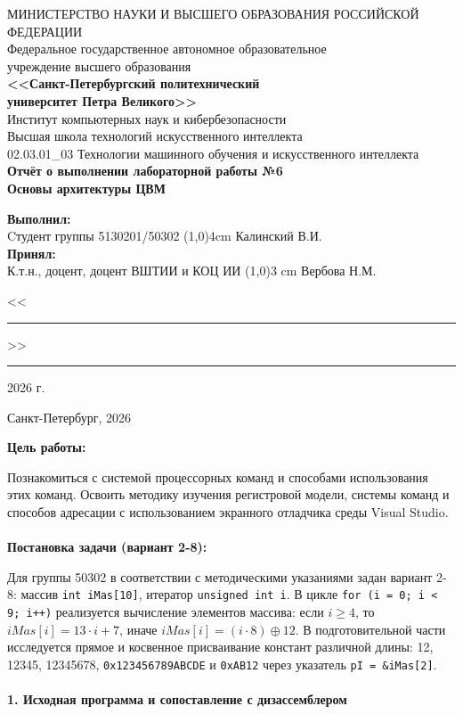 \documentclass[14pt, a4paper]{extarticle}
\begin{document}
	\thispagestyle{empty}
	\begin{center}
		\hspace{0.2cm}МИНИСТЕРСТВО НАУКИ И ВЫСШЕГО ОБРАЗОВАНИЯ РОССИЙСКОЙ ФЕДЕРАЦИИ\\
		Федеральное государственное автономное образовательное\\
		учреждение высшего образования\\
		{\bf <<Санкт-Петербургский политехнический\\
			университет Петра Великого>>}\\
		Институт компьютерных наук и кибербезопасности\\
		Высшая школа технологий искусственного интеллекта\\
		02.03.01\_03 Технологии машинного обучения и искусственного интеллекта\\
		\vspace{3cm}
		\Large\bf{
			Отчёт о выполнении лабораторной работы №6\\
			Основы архитектуры ЦВМ\\[1cm]
		}
	\end{center}
	\vspace{2cm}
	\begin{flushleft}
		{\bf Выполнил:}\\
		Cтудент группы 5130201/50302 \hfill
		\line(1,0){4cm} \quad Калинский В.И.\\
		{\bf Принял:}\\
		К.т.н., доцент, доцент ВШТИИ и КОЦ ИИ \hfill
		\line(1,0){3 cm} \quad Вербова Н.М.\\[0.5cm]
		{ \hfill<<\rule{1cm}{0.5pt}>>\rule{2cm}{0.5pt}\hspace{3pt}2026 г.}
	\end{flushleft}
	\vspace{1cm}
	\begin{center}
		Санкт-Петербург, 2026
	\end{center}
	\newpage

	\noindent \textbf{Цель работы:}
	
	Познакомиться с системой процессорных команд и способами использования этих команд. Освоить методику изучения регистровой модели, системы команд и способов адресации с использованием экранного отладчика среды Visual Studio.
	\\\\
	\noindent \textbf{Постановка задачи (вариант 2-8):}
	
	Для группы 50302 в соответствии с методическими указаниями задан вариант 2-8: массив \texttt{int iMas[10]}, итератор \texttt{unsigned int i}. В цикле \texttt{for (i = 0; i < 9; i++)} реализуется вычисление элементов массива: если $i \ge 4$, то $iMas[i] = 13 \cdot i + 7$, иначе $iMas[i] = (i \cdot 8) \oplus 12$. В подготовительной части исследуется прямое и косвенное присваивание констант различной длины: 12, 12345, 12345678, \texttt{0x123456789ABCDE} и \texttt{0xAB12} через указатель \texttt{pI = \&iMas[2]}.
	\\\\
	\noindent \textbf{1. Исходная программа и сопоставление с дизассемблером}
	
\end{document}
